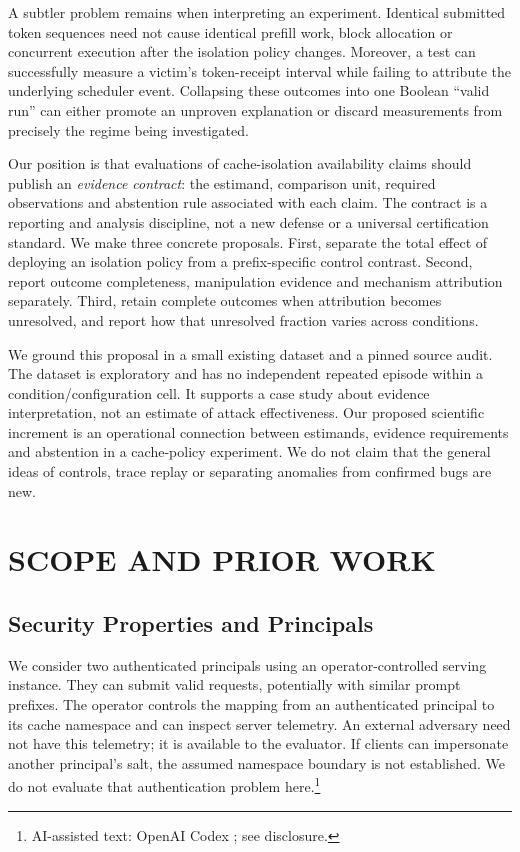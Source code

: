 \documentclass[a4paper,twoside]{article}
\newcommand{\aicite}{\footnote{AI-assisted text: OpenAI Codex \cite{codex}; see disclosure.}}
\begin{document}
A subtler problem remains when interpreting an experiment. Identical submitted token sequences need not cause identical prefill work, block allocation or concurrent execution after the isolation policy changes. Moreover, a test can successfully measure a victim's token-receipt interval while failing to attribute the underlying scheduler event. Collapsing these outcomes into one Boolean ``valid run'' can either promote an unproven explanation or discard measurements from precisely the regime being investigated.

Our position is that evaluations of cache-isolation availability claims should publish an \emph{evidence contract}: the estimand, comparison unit, required observations and abstention rule associated with each claim. The contract is a reporting and analysis discipline, not a new defense or a universal certification standard. We make three concrete proposals. First, separate the total effect of deploying an isolation policy from a prefix-specific control contrast. Second, report outcome completeness, manipulation evidence and mechanism attribution separately. Third, retain complete outcomes when attribution becomes unresolved, and report how that unresolved fraction varies across conditions.

We ground this proposal in a small existing dataset and a pinned source audit. The dataset is exploratory and has no independent repeated episode within a condition/configuration cell. It supports a case study about evidence interpretation, not an estimate of attack effectiveness. Our proposed scientific increment is an operational connection between estimands, evidence requirements and abstention in a cache-policy experiment. We do not claim that the general ideas of controls, trace replay or separating anomalies from confirmed bugs are new.

\section{\uppercase{Scope and Prior Work}}

\subsection{Security Properties and Principals}

We consider two authenticated principals using an operator-controlled serving instance. They can submit valid requests, potentially with similar prompt prefixes. The operator controls the mapping from an authenticated principal to its cache namespace and can inspect server telemetry. An external adversary need not have this telemetry; it is available to the evaluator. If clients can impersonate another principal's salt, the assumed namespace boundary is not established. We do not evaluate that authentication problem here.\aicite
\end{document}
